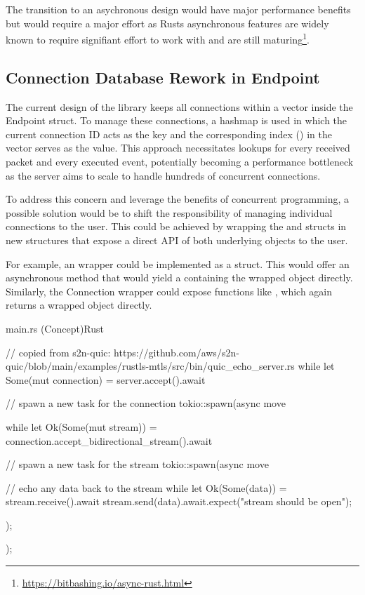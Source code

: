The transition to an asychronous design would have major performance benefits but would require a major effort as Rusts asynchronous
features are widely known to require signifiant effort to work with and are still
maturing\footnote{\url{https://bitbashing.io/async-rust.html}}.

\subsection{Connection Database Rework in Endpoint} \label{connection_db_rework}

The current design of the library keeps all connections within a vector inside the Endpoint struct. To manage these connections,
a hashmap is used in which the current connection ID acts as the key and the corresponding index () in the
vector serves as the value. This approach necessitates lookups for every received packet and every executed event, potentially
becoming a performance bottleneck as the server aims to scale to handle hundreds of concurrent connections.

To address this concern and leverage the benefits of concurrent programming, a possible solution would be to shift the responsibility
of managing individual connections to the user. This could be achieved by wrapping the  and 
structs in new structures that expose a direct API of both underlying objects to the user.

For example, an  wrapper could be implemented as a  struct. This  would offer
an asynchronous  method that would yield a  containing the wrapped 
object directly. Similarly, the Connection wrapper could expose functions like , which again returns
a wrapped  object directly.

\begin{codeblock}{main.rs (Concept)}{Rust}
    \begin{rustcode}
        // copied from s2n-quic: https://github.com/aws/s2n-quic/blob/main/examples/rustls-mtls/src/bin/quic_echo_server.rs
        while let Some(mut connection) = server.accept().await {
            // spawn a new task for the connection
            tokio::spawn(async move {

                while let Ok(Some(mut stream)) = connection.accept_bidirectional_stream().await {
                    // spawn a new task for the stream
                    tokio::spawn(async move {

                        // echo any data back to the stream
                        while let Ok(Some(data)) = stream.receive().await {
                            stream.send(data).await.expect("stream should be open");
                        }
                    });
                }
            });
        }
    \end{rustcode}
    \label{example_lib_redesign}
\end{codeblock}

